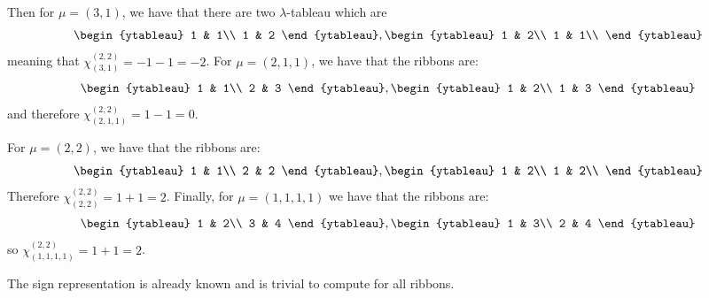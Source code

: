 \documentclass[]{article}
\begin{document}
Then for $\mu = (3,1)$, we have that there are two $\lambda$-tableau which are
\begin{equation}
	\begin{ytableau}
		1 & 1\\
		1 & 2
	\end{ytableau}
	,
	\begin{ytableau}
		1 & 2\\
		1 & 1\\
	\end{ytableau}
\end{equation}
meaning that $\chi^{(2,2)}_{(3,1)} = -1 - 1 = -2$.
For $\mu = (2,1,1)$, we have that the ribbons are:
\begin{equation}
	\begin{ytableau}
		1 & 1\\
		2 & 3
	\end{ytableau}
	,
	\begin{ytableau}
	1 & 2\\
	1 & 3
\end{ytableau}
\end{equation}
and therefore $\chi^{(2,2)}_{(2,1,1)} = 1 - 1 = 0$.

For $\mu = (2,2)$, we have that the ribbons are:
\begin{equation}
	\begin{ytableau}
		1 & 1\\
		2 & 2
	\end{ytableau}
	,
	\begin{ytableau}
		1 & 2\\
		1 & 2\\
	\end{ytableau}
\end{equation}
Therefore $\chi^{(2,2)}_{(2,2)} = 1+ 1 = 2$.
Finally, for $\mu = (1,1,1,1)$ we have that the ribbons are:
\begin{equation}
	\begin{ytableau}
		1 & 2\\
		3 & 4
	\end{ytableau}
	,
	\begin{ytableau}
		1 & 3\\
		2 & 4
	\end{ytableau}
\end{equation}
so $\chi^{(2,2)}_{(1,1,1,1)} = 1+ 1 = 2$.

The sign representation is already known and is trivial to compute for all ribbons.
\end{document}
